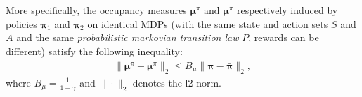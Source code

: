 \begin{lemma}
    \label{lemma:mu_is_lipschitz_with_pi} More specifically, the occupancy measures $\bm{\mu}^{\pi}$ and $\bm{\mu}^{\bar{\pi}}$ respectively induced by policies $\bm{\pi}_1$ and $\bm{\pi}_2$ on identical MDPs (with the same state and action sets $S$ and $A$ and the same \textit{probabilistic markovian transition law} $P$, rewards can be different) satisfy the following inequality:
    \begin{align*}
        \| \bm{\mu}^{\pi} - \bm{\mu}^{\bar{\pi}} \|_2 
        \leq 
        B_\mu \| \bm{\pi} - \bar{\bm{\pi}} \|_2,
    \end{align*}
    where $B_\mu = \frac{1}{1-\gamma}$ and $\|\cdot\|_2$ denotes the l2 norm.
\end{lemma}
